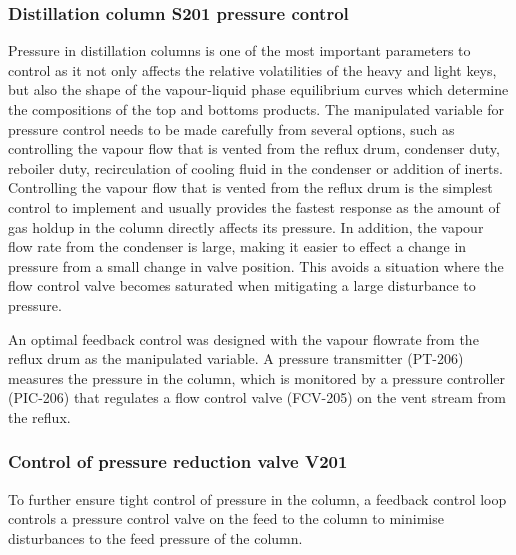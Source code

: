 \subsubsection{Distillation column S201 pressure control} %
Pressure in distillation columns is one of the most important parameters to control as it not only affects the relative volatilities of the heavy and light keys, but also the shape of the vapour-liquid phase equilibrium curves which determine the compositions of the top and bottoms products. The manipulated variable for pressure control needs to be made carefully from several options, such as controlling the vapour flow that is vented from the reflux drum, condenser duty, reboiler duty, recirculation of cooling fluid in the condenser or addition of inerts. Controlling the vapour flow that is vented from the reflux drum is the simplest control to implement and usually provides the fastest response as the amount of gas holdup in the column directly affects its pressure. In addition, the vapour flow rate from the condenser is large, making it easier to effect a change in pressure from a small change in valve position. This avoids a situation where the flow control valve becomes saturated when mitigating a large disturbance to pressure. 

An optimal feedback control was designed with the vapour flowrate from the reflux drum as the manipulated variable. A pressure transmitter (PT-206) measures the pressure in the column, which is monitored by a pressure controller (PIC-206) that regulates a flow control valve (FCV-205) on the vent stream from the reflux.



\subsubsection{Control of pressure reduction valve V201} %
To further ensure tight control of pressure in the column, a feedback control loop controls a pressure control valve on the feed to the column to minimise disturbances to the feed pressure of the column.



